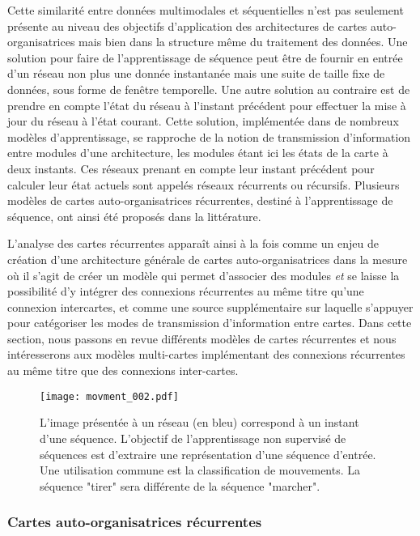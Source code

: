 \documentclass[../main]{subfiles}
\begin{document}
Cette similarité entre données multimodales et séquentielles n'est pas seulement présente au niveau des objectifs d'application des architectures de cartes auto-organisatrices mais bien dans la structure même du traitement des données. 
Une solution pour faire de l'apprentissage de séquence peut être de fournir en entrée d'un réseau non plus une donnée instantanée mais une suite de taille fixe de données, sous forme de fenêtre temporelle.
Une autre solution au contraire est de prendre en compte l'état du réseau à l'instant précédent pour effectuer la mise à jour du réseau à l'état courant. Cette solution, implémentée dans de nombreux modèles d'apprentissage, se rapproche de la notion de transmission d'information entre modules d'une architecture, les modules étant ici les états de la carte à deux instants. 
Ces réseaux prenant en compte leur instant précédent pour calculer leur état actuels sont appelés réseaux récurrents ou récursifs.
Plusieurs modèles de cartes auto-organisatrices récurrentes, destiné à l'apprentissage de séquence, ont ainsi été proposés dans la littérature.


L'analyse des cartes récurrentes apparaît ainsi à la fois comme un enjeu de création d'une architecture générale de cartes auto-organisatrices dans la mesure où il s'agit de créer un modèle qui permet d'associer des modules \emph{et} se laisse la possibilité d'y intégrer des connexions récurrentes au même titre qu'une connexion intercartes, et comme une source supplémentaire sur laquelle s'appuyer pour catégoriser les modes de transmission d'information entre cartes. Dans cette section, nous passons en revue différents modèles de cartes récurrentes et nous intéresserons aux modèles multi-cartes implémentant des connexions récurrentes au même titre que des connexions inter-cartes.

\begin{figure}
    \centering\texttt{[image: movment\_002.pdf]}
    \caption{L'image présentée à un réseau (en bleu) correspond à un instant d'une séquence. L'objectif de l'apprentissage non supervisé de séquences est d'extraire une représentation d'une séquence d'entrée. Une utilisation commune est la classification de mouvements. La séquence "tirer" sera différente de la séquence "marcher".\label{fig:mouvement}}
 \end{figure}


\subsubsection{Cartes auto-organisatrices récurrentes}
\end{document}
